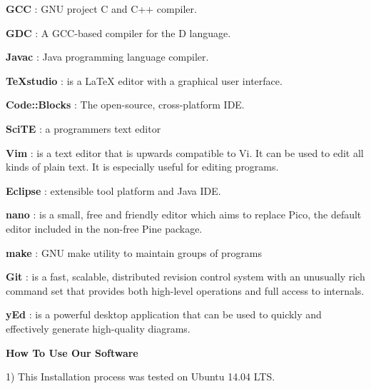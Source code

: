 \documentclass{slides}
\begin{document}
\begin{center}
\textbf{GCC} : GNU project C and C++ compiler.
\end{center}
\begin{center}
 \textbf{GDC} : A GCC-based compiler for the D language.
\end{center}
\begin{center}
\textbf{Javac} : Java programming language compiler.
\end{center}
\begin{center}
\textbf{TeXstudio} : is a LaTeX editor with a graphical user  interface.
\end{center}
\begin{center}
\textbf{Code::Blocks} : The open-source, cross-platform IDE.
\end{center}
\begin{center}
\textbf{SciTE} : a programmers text editor
\end{center}
\begin{center}
\textbf{Vim} : is a text editor that is upwards compatible to Vi.  It can be used to edit all kinds of plain text.  It is especially useful  for editing programs.
\end{center}
\newpage
\begin{center}
\textbf{Eclipse} : extensible tool platform and Java IDE.
\end{center}
\begin{center}
\textbf{ nano} : is  a small, free and friendly editor which aims to replace Pico, the default editor included in the non-free Pine package.
\end{center}
\begin{center}
\textbf{make} : GNU make utility to maintain groups of programs
\end{center}
\begin{center}
\textbf{Git} : is a fast, scalable, distributed revision control system with an unusually rich command set that provides both high-level operations and full access to internals.
\end{center}
\begin{center}
\textbf{yEd} : is a powerful desktop application that can be used to quickly and effectively generate high-quality diagrams.
\end{center}
\newpage
\begin{center}
\textbf{\Large How To Use Our Software}
\end{center}
\begin{center}
1) This Installation process was tested on Ubuntu 14.04 LTS.
\end{center}
\end{document}

